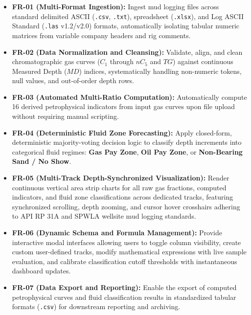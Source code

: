 \begin{itemize}
    \item \textbf{FR-01 (Multi-Format Ingestion):} Ingest mud logging files across standard delimited ASCII (\texttt{.csv}, \texttt{.txt}), spreadsheet (\texttt{.xlsx}), and Log ASCII Standard (\texttt{.las} v1.2/v2.0) formats, automatically isolating tabular numeric matrices from variable company headers and rig comments.
    \item \textbf{FR-02 (Data Normalization and Cleansing):} Validate, align, and clean chromatographic gas curves ($C_1$ through $nC_5$ and $TG$) against continuous Measured Depth ($MD$) indices, systematically handling non-numeric tokens, null values, and out-of-order depth rows.
    \item \textbf{FR-03 (Automated Multi-Ratio Computation):} Automatically compute 16 derived petrophysical indicators from input gas curves upon file upload without requiring manual scripting.
    \item \textbf{FR-04 (Deterministic Fluid Zone Forecasting):} Apply closed-form, deterministic majority-voting decision logic to classify depth increments into categorical fluid regimes: \textbf{Gas Pay Zone}, \textbf{Oil Pay Zone}, or \textbf{Non-Bearing Sand / No Show}.
    \item \textbf{FR-05 (Multi-Track Depth-Synchronized Visualization):} Render continuous vertical area strip charts for all raw gas fractions, computed indicators, and fluid zone classifications across dedicated tracks, featuring synchronized scrolling, depth zooming, and cursor hover crosshairs adhering to API RP 31A and SPWLA wellsite mud logging standards.
    \item \textbf{FR-06 (Dynamic Schema and Formula Management):} Provide interactive modal interfaces allowing users to toggle column visibility, create custom user-defined tracks, modify mathematical expressions with live sample evaluation, and calibrate classification cutoff thresholds with instantaneous dashboard updates.
    \item \textbf{FR-07 (Data Export and Reporting):} Enable the export of computed petrophysical curves and fluid classification results in standardized tabular formats (\texttt{.csv}) for downstream reporting and archiving.
\end{itemize}

